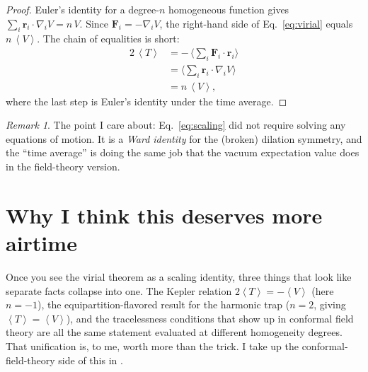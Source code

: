 \documentclass[11pt]{article}
\theoremstyle{remark}
\newtheorem*{remark}{Remark}
\newcommand{\ev}[1]{\left\langle #1 \right\rangle}
\newcommand{\grad}{\nabla}
\begin{document}
\begin{proof}
Euler's identity for a degree-$n$ homogeneous function gives
$\sum_i \mathbf{r}_i \cdot \grad_i V = n\,V$. Since $\mathbf{F}_i = -\grad_i V$,
the right-hand side of Eq.~\eqref{eq:virial} equals $n\,\ev{V}$. The chain of
equalities is short:
\begin{align}
  2\,\ev{T}
    &= -\, \Big\langle \sum_i \mathbf{F}_i \cdot \mathbf{r}_i \Big\rangle \\
    &= \Big\langle \sum_i \mathbf{r}_i \cdot \grad_i V \Big\rangle \\
    &= n\,\ev{V},
\end{align}
where the last step is Euler's identity under the time average.
\end{proof}

\begin{remark}
The point I care about: Eq.~\eqref{eq:scaling} did not require solving any
equations of motion. It is a \emph{Ward identity} for the (broken) dilation
symmetry, and the ``time average'' is doing the same job that the vacuum
expectation value does in the field-theory version.
\end{remark}

\section{Why I think this deserves more airtime}

Once you see the virial theorem as a scaling identity, three things that look
like separate facts collapse into one. The Kepler relation $2\ev{T} = -\ev{V}$
(here $n=-1$), the equipartition-flavored result for the harmonic trap
($n = 2$, giving $\ev{T} = \ev{V}$), and the tracelessness conditions that show
up in conformal field theory are all the same statement evaluated at different
homogeneity degrees. That unification is, to me, worth more than the trick.
I take up the conformal-field-theory side of this in .
\end{document}
